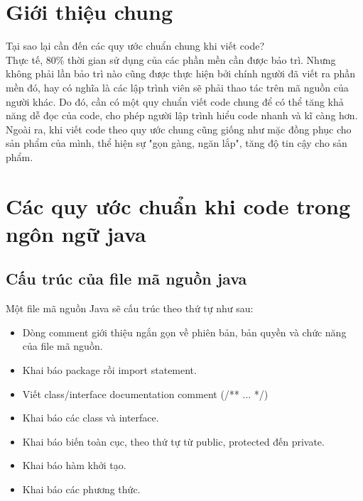 \documentclass[a4paper]{report}
\author{Truong Quang Khanh}
\begin{document}
	\chapter{Giới thiệu chung}
	Tại sao lại cần đến các quy ước chuẩn chung khi viết code? \\
    Thực tế, 80\% thời gian sử dụng của các phần mền cần được bảo trì. Nhưng không phải lần 		bảo trì nào cũng được thực hiện bởi chính người đã viết ra phần mền đó, hay có nghĩa là 	các lập trình viên sẽ phải thao tác trên mã nguồn của người khác. Do đó, cần có một quy 	chuẩn viết code chung để có thể tăng khả năng dễ đọc của code, cho phép người lập trình 	hiểu code nhanh và kĩ càng hơn. Ngoài ra, khi viết code theo quy ước chung cũng giống 			như mặc đồng phục cho sản phẩm của mình, thể hiện sự "gọn gàng, ngăn lắp", tăng độ tin 		cậy cho sản phẩm.
	\chapter{Các quy ước chuẩn khi code trong ngôn ngữ java}
	\section{Cấu trúc của file mã nguồn java}
    Một file mã nguồn Java sẽ cấu trúc theo thứ tự như sau:
    \begin{itemize}
        \item Dòng comment giới thiệu ngắn gọn về phiên bản, bản quyền và chức năng của 				file mã nguồn.
        \item Khai báo package rồi import statement.
        \item Viết class/interface documentation comment (/** ... */)
        \item Khai báo các class và interface.
        \item Khai báo biến toàn cục, theo thứ tự từ public, protected đến private.
        \item Khai báo hàm khởi tạo.
        \item Khai báo các phương thức.
    \end{itemize}
\end{document}
